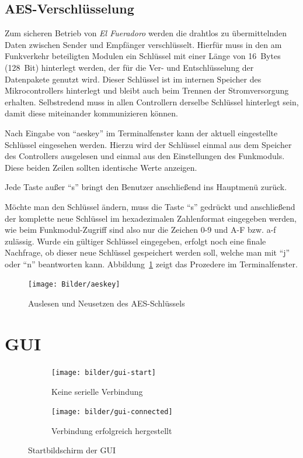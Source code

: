 \documentclass[paper=a4, parskip, numbers=noenddot, toc=listof, headsepline]{scrbook}
\newcommand{\anlage}{\emph{El Fueradoro}}
\begin{document}
			\subsection{AES-Verschlüsselung}
				\label{sec:encryption}

				Zum sicheren Betrieb von {\anlage} werden die drahtlos zu übermittelnden Daten zwischen Sender und Empfänger verschlüsselt. Hierfür muss in den am Funkverkehr beteiligten Modulen ein Schlüssel mit einer Länge von 16~Bytes (128~Bit) hinterlegt werden, der für die Ver- und Entschlüsselung der Datenpakete genutzt wird. Dieser Schlüssel ist im internen Speicher des Mikrocontrollers hinterlegt und bleibt auch beim Trennen der Stromversorgung erhalten. Selbstredend muss in allen Controllern derselbe Schlüssel hinterlegt sein, damit diese miteinander kommunizieren können.

				Nach Eingabe von \enquote{aeskey} im Terminalfenster kann der aktuell eingestellte Schlüssel eingesehen werden. Hierzu wird der Schlüssel einmal aus dem Speicher des Controllers ausgelesen und einmal aus den Einstellungen des Funkmoduls. Diese beiden Zeilen sollten identische Werte anzeigen.

				Jede Taste außer \enquote{s} bringt den Benutzer anschließend ins Hauptmenü zurück.

				Möchte man den Schlüssel ändern, muss die Taste \enquote{s} gedrückt und anschließend der komplette neue Schlüssel im hexadezimalen Zahlenformat eingegeben werden, wie beim Funkmodul-Zugriff sind also nur die Zeichen 0-9 und A-F bzw. a-f zulässig. Wurde ein gültiger Schlüssel eingegeben, erfolgt noch eine finale Nachfrage, ob dieser neue Schlüssel gespeichert werden soll, welche man mit \enquote{j} oder \enquote{n} beantworten kann. Abbildung~\ref{fig:aeskey} zeigt das Prozedere im Terminalfenster.

				\begin{figure}[!h]
					\centering
					\texttt{[image: Bilder/aeskey]}
					\caption{Auslesen und Neusetzen des AES-Schlüssels}
					\label{fig:aeskey}
				\end{figure}
				\clearpage

		\section{GUI}

			\begin{figure}[!h]%
				\centering
				\begin{subfigure}[t]{0.45\textwidth}
					\texttt{[image: bilder/gui-start]}
					\caption{Keine serielle Verbindung}
					\label{fig:gui-unconnected}
				\end{subfigure}
				\begin{subfigure}[t]{0.45\textwidth}
					\texttt{[image: bilder/gui-connected]}
					\caption{Verbindung erfolgreich hergestellt}
					\label{fig:gui-connected}
				\end{subfigure}
				\caption{Startbildschirm der GUI}
				\label{fig:gui-start}
			\end{figure}
\end{document}
